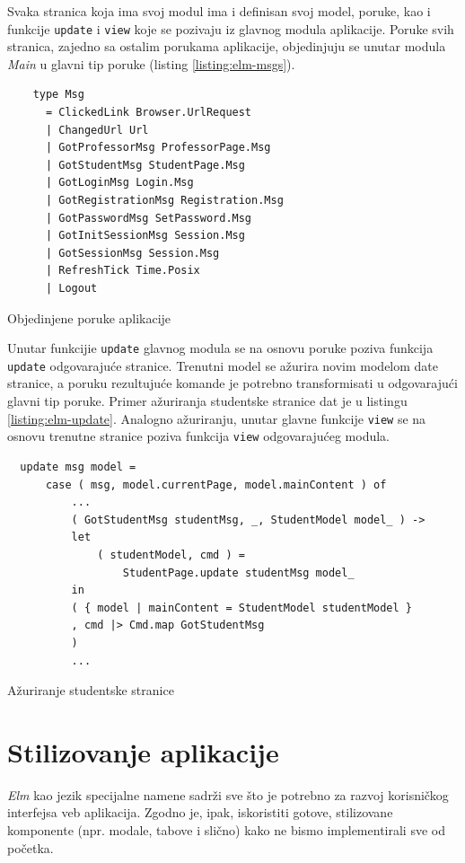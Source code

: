 \documentclass[12pt,oneside]{memoir}
\begin{document}
Svaka stranica koja ima svoj modul ima i definisan svoj model, poruke, kao i funkcije \texttt{update} i \texttt{view} koje
se pozivaju iz glavnog modula aplikacije. Poruke svih stranica, zajedno sa ostalim porukama aplikacije, objedinjuju
se unutar modula \emph{Main} u glavni tip poruke (listing \ref{listing:elm-msgs}).
\begin{listing}[h]
  \begin{verbatim}
    type Msg
      = ClickedLink Browser.UrlRequest
      | ChangedUrl Url
      | GotProfessorMsg ProfessorPage.Msg
      | GotStudentMsg StudentPage.Msg
      | GotLoginMsg Login.Msg
      | GotRegistrationMsg Registration.Msg
      | GotPasswordMsg SetPassword.Msg
      | GotInitSessionMsg Session.Msg
      | GotSessionMsg Session.Msg
      | RefreshTick Time.Posix
      | Logout
  \end{verbatim}
  \caption{Objedinjene poruke aplikacije}
  \label{listing:elm-msgs}
  \end{listing}
Unutar funkcijie \texttt{update} glavnog modula se na osnovu poruke poziva funkcija \texttt{update}
odgovarajuće stranice. Trenutni model se ažurira novim modelom date stranice, a poruku rezultujuće komande je potrebno
transformisati u odgovarajući glavni tip poruke. Primer ažuriranja studentske stranice dat je u listingu \ref{listing:elm-update}.
Analogno ažuriranju, unutar glavne funkcije \texttt{view} se na osnovu trenutne stranice poziva funkcija \texttt{view} odgovarajućeg modula.  
\begin{listing}[h]
\begin{verbatim}
  update msg model =
      case ( msg, model.currentPage, model.mainContent ) of
          ...
          ( GotStudentMsg studentMsg, _, StudentModel model_ ) ->
          let
              ( studentModel, cmd ) =
                  StudentPage.update studentMsg model_
          in
          ( { model | mainContent = StudentModel studentModel }
          , cmd |> Cmd.map GotStudentMsg
          )
          ...
\end{verbatim}
\caption{Ažuriranje studentske stranice}
\label{listing:elm-update}
\end{listing} 


\section{Stilizovanje aplikacije}
\emph{Elm} kao jezik specijalne namene sadrži sve što je potrebno za razvoj korisničkog interfejsa veb aplikacija.
Zgodno je, ipak, iskoristiti gotove, stilizovane komponente (npr. modale, tabove i slično) kako ne bismo
implementirali sve od početka.
\end{document}
